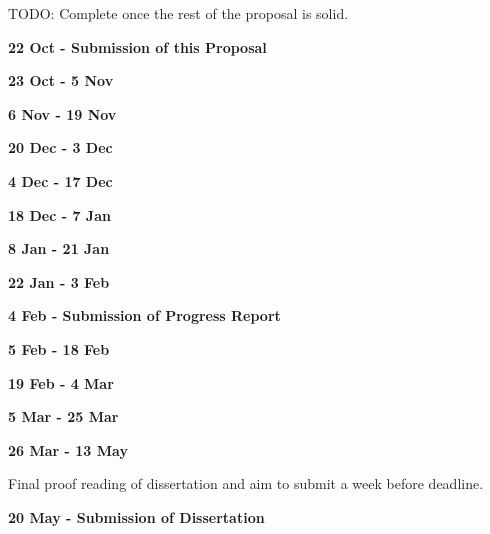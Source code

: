 TODO: Complete once the rest of the proposal is solid.

\textbf{22 Oct - Submission of this Proposal}

\textbf{23 Oct - 5 Nov}


\textbf{6 Nov - 19 Nov}


\textbf{20 Dec - 3 Dec}


\textbf{4 Dec - 17 Dec}


\textbf{18 Dec - 7 Jan}


\textbf{8 Jan - 21 Jan}

\textbf{22 Jan - 3 Feb}

\textbf{4 Feb - Submission of Progress Report}

\textbf{5 Feb - 18 Feb}


\textbf{19 Feb - 4 Mar}


\textbf{5 Mar - 25 Mar}


\textbf{26 Mar - 13 May}

Final proof reading of dissertation and aim to submit a week before deadline.

\textbf{20 May - Submission of Dissertation}
